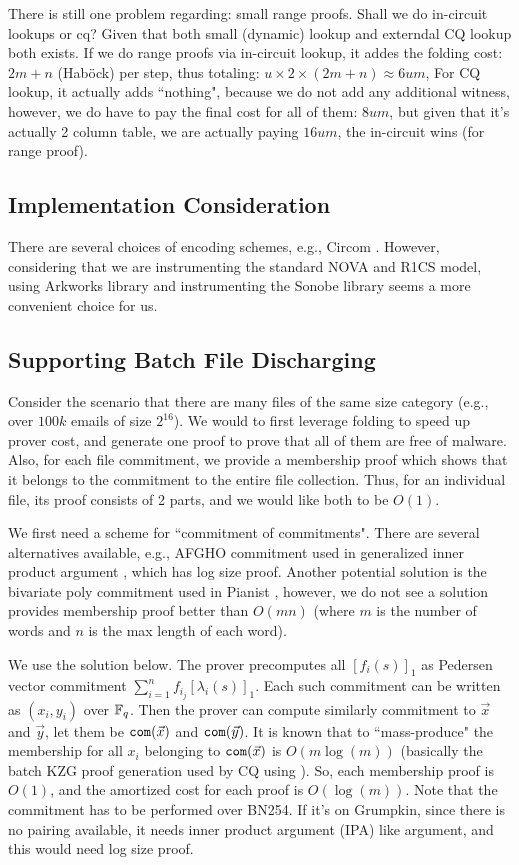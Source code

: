 {{There is still one problem regarding: small range proofs. Shall we
do in-circuit lookups or cq? Given that both small (dynamic) lookup
and externdal CQ lookup both exists. If we do range proofs via
in-circuit lookup, it addes the folding cost: $2m+n$ (Hab\"{o}ck) per
step, thus totaling: $u \times 2 \times (2m+n) \approx 6um$,
For CQ lookup, it actually adds ``nothing", because we do not add
any additional witness, however, we do have to pay the final cost
for all of them: $8um$, but given that it's actually 2 column table,
we are actually paying $16um$, the in-circuit wins (for range proof).

\subsection{Implementation Consideration}
There are several choices of encoding schemes, e.g.,
Circom \cite{circom}. However, considering that
we are instrumenting the standard NOVA and R1CS model,
using Arkworks library \cite{arkworks} and instrumenting the Sonobe
library seems a more convenient choice for us.

\subsection{Supporting Batch File Discharging}
Consider the scenario that there are many files of the same
size category (e.g., over $100k$ emails of size $2^{16}$).
We would to first leverage folding to speed up prover cost,
and generate one proof to prove that all of them are free of
malware. Also, for each file commitment, we provide a membership
proof which shows that it belongs to the commitment to the
entire file collection. Thus, for an individual file, its proof
consists of 2 parts, and we would like both to be $O(1)$.

We first need a scheme for ``commitment of commitments". 
There are several alternatives available, e.g., 
AFGHO commitment used in generalized inner product argument \cite{Bunz21},
which has log size proof.  Another potential solution is
the bivariate poly commitment used in Pianist \cite{Pianist},
however, we do not see a solution provides membership proof
better than $O(mn)$ (where $m$ is the number of words and $n$ is the
max length of each word).

We use the solution below.  The prover precomputes all $[f_i(s)]_1$
as Pedersen vector commitment $\sum_{i=1}^n f_{i_j} [\lambda_i(s)]_1$.
Each such commitment can be written as $(x_i, y_i)$ over $\mathbb{F}_q$. 
Then the prover can compute similarly commitment to $\vec{x}$
and $\vec{y}$, let them be $\mathtt{com}(\vec{x})$ and $\mathtt{com}(\vec{y})$.
It is known that to ``mass-produce" the membership for
all $x_i$ belonging to $\mathtt{com}(\vec{x})$ is $O(m\log(m))$ (basically
the batch KZG proof generation used by CQ \cite{cq} using
\cite{FK23}). So, each membership proof is $O(1)$, and the
amortized cost for each proof is $O(\log(m))$. Note that the commitment
has to be performed over BN254. If it's on Grumpkin, since
there is no pairing available, it needs inner product argument (IPA)
like argument, and this would need log size proof.

}}

